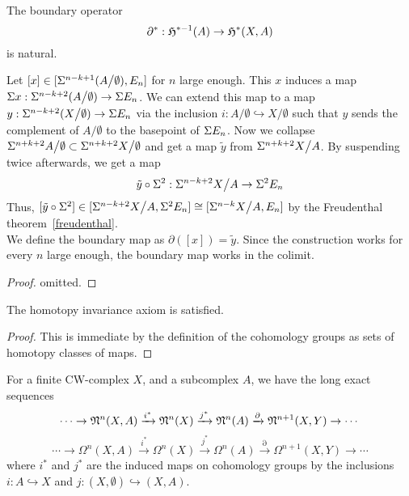 \documentclass[a4paper,12pt]{article}
\begin{document}
\begin{lemma}[Naturality]\label{coboundary}
    The boundary operator
    \[\partial^\ast:\mathfrak{H}^{\ast-1}(A)\to\mathfrak{H}^\ast(X,A)\]
    is natural.
\end{lemma}

\begin{remark}
    Let \([x]\in[\Sigma^{n-k+1}(A\big/\emptyset),E_n]\) for \(n\) large enough. This \(x\) induces a map \(\Sigma x:\Sigma^{n-k+2}(A\big/\emptyset)\to\Sigma E_n\). We can extend this map to a map \(y:\Sigma^{n-k+2}(X\big/\emptyset)\to\Sigma E_n\) via the inclusion \(i:A\big/\emptyset\hookrightarrow X\big/\emptyset\) such that \(y\) sends the complement of \(A\big/\emptyset\) to the basepoint of \(\Sigma E_n\). 
    Now we collapse \(\Sigma^{n+k+2}A\big/\emptyset\subset\Sigma^{n+k+2}X\big/\emptyset\) and get a map \(\tilde y\) from \(\Sigma^{n+k+2}X\big/A\).
    By suspending twice afterwards, we get a map
    \[\tilde y\circ\Sigma^2:\Sigma^{n-k+2}X\big/A\to \Sigma^2 E_n\]
    Thus, \([\tilde y\circ\Sigma^2]\in[\Sigma^{n-k+2}X\big/A,\Sigma^2 E_n]\cong[\Sigma^{n-k}X\big/A,E_n]\) by the Freudenthal theorem\ \ref{freudenthal}.\\
    We define the boundary map as \(\partial([x])=\tilde y\). Since the construction works for every \(n\) large enough, the boundary map works in the colimit.
\end{remark}

\begin{proof}
    omitted.
\end{proof}

\begin{lemma}\label{cohtpy inv}
    The homotopy invariance axiom is satisfied.
\end{lemma}

\begin{proof}
    This is immediate by the definition of the cohomology groups as sets of homotopy classes of maps.
\end{proof}

\begin{lemma}\label{coles}
    For a finite CW-complex \(X\), and a subcomplex \(A\), we have the long exact sequences
    \[\cdots\to\mathfrak{N}^n(X,A)\xrightarrow{i^\ast}\mathfrak{N}^n(X)\xrightarrow{j^\ast}\mathfrak{N}^n(A)\xrightarrow{\partial}\mathfrak{N}^{n+1}(X,Y)\to\cdots\]
    \[\cdots\to\Omega^n(X,A)\xrightarrow{i^\ast}\Omega^n(X)\xrightarrow{j^\ast}\Omega^n(A)\xrightarrow{\partial}\Omega^{n+1}(X,Y)\to\cdots\]
    where \(i^\ast\) and \(j^\ast\) are the induced maps on cohomology groups by the inclusions \(i:A\hookrightarrow X\) and \(j:(X,\emptyset)\hookrightarrow (X,A)\).
\end{lemma}
\end{document}
